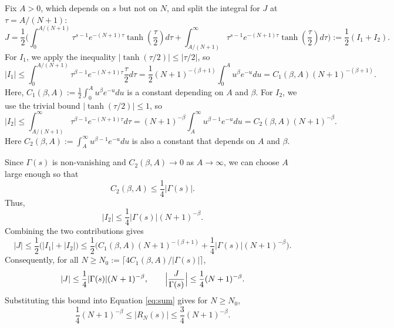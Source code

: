 \documentclass[aps,pra,twocolumn,superscriptaddress,preprintnumbers,amsmath,amssymb]{revtex4-2}
\begin{document}
 Fix $A>0$, which depends on $s$ but not on $N$, and split the integral for $J$ at $\tau = A/(N+1)$:
\begin{equation}
    J=\frac{1}{2}\Bigg(\int_0^{A/(N+1)}\tau^{s-1}e^{-(N+1)\tau}\tanh( \frac{\tau}{2})d\tau+\int_{A/(N+1)}^\infty \tau^{s-1}e^{-(N+1)\tau}\tanh( \frac{\tau}{2})d\tau\Bigg) 
:= \frac12(I_{1}+I_{2}).
\end{equation}
For $I_1$, we apply the inequality \( |\tanh(\tau/2)| \le |\tau/2| \), so
\begin{equation}
|I_1|\le\int_0^{A/(N+1)} \tau^{\beta-1} e^{-(N+1)\tau}\frac{\tau}{2}d\tau
=\frac{1}{2} (N+1)^{-(\beta+1)}\int_0^A u^{\beta} e^{-u}du=C_1(\beta,A)(N+1)^{-(\beta+1)}.
\end{equation}
Here,  $C_1(\beta,A):=\tfrac12\int_0^A u^{\beta}e^{-u}du$ is a constant  depending on $A$ and $\beta$. For $I_2$, we use the trivial bound $|\tanh(\tau/2)|\le 1$, so
\begin{equation}
    |I_2|\le \int_{A/(N+1)}^\infty \tau^{\beta-1} e^{-(N+1)\tau}d\tau=(N+1)^{-\beta}\int_A^\infty u^{\beta-1} e^{-u}du=C_2(\beta,A)(N+1)^{-\beta}.
\end{equation}
Here $C_2(\beta,A):=\int_A^\infty u^{\beta-1}e^{-u}du$ is also a constant that depends on $A$ and $\beta$.\par
Since $\Gamma(s)$ is non-vanishing  and $C_2(\beta,A)\to 0$ as $A\to\infty$, we can choose $A$ large enough so that
\begin{equation}
    C_2(\beta,A)\le \frac{1}{4}|\Gamma(s)|.
\end{equation}
Thus,
\begin{equation}
    |I_{2}|\leq\frac{1}{4}|\Gamma(s)|(N+1)^{-\beta}.
\end{equation}
Combining the two contributions gives
\begin{equation}
    |J|\le \frac12\big(|I_{1}|+|I_{2}|\big)
\le \frac12\Big(C_1(\beta,A)(N+1)^{-(\beta+1)}+\frac{1}{4}|\Gamma(s)|(N+1)^{-\beta}\Big).
\end{equation}
Consequently, for all $N\ge N_0:=\bigl\lceil 4C_1(\beta,A)/|\Gamma(s)|\bigr\rceil$, 
\begin{equation}
    |J|\le \frac{1}{4}|\Gamma(s)|(N+1)^{-\beta}, \qquad \Bigl|\frac{J}{\Gamma(s)}\Bigr|\leq \frac{1}{4}(N+1)^{-\beta}.
\end{equation}
Substituting this bound into Equation \eqref{eq:sum} gives for $N\geq N_0$,
\begin{equation}
    \frac{1}{4}(N+1)^{-\beta}\leq|R_N(s)|\leq\frac{3}{4}(N+1)^{-\beta}.
\end{equation}
\end{document}
